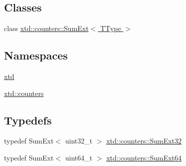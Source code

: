 \subsection*{Classes}
\begin{DoxyCompactItemize}
\item 
class \hyperlink{classxtd_1_1counters_1_1SumExt}{xtd\-::counters\-::\-Sum\-Ext$<$ T\-Type $>$}
\end{DoxyCompactItemize}
\subsection*{Namespaces}
\begin{DoxyCompactItemize}
\item 
\hyperlink{namespacextd}{xtd}
\item 
\hyperlink{namespacextd_1_1counters}{xtd\-::counters}
\end{DoxyCompactItemize}
\subsection*{Typedefs}
\begin{DoxyCompactItemize}
\item 
typedef Sum\-Ext$<$ uint32\-\_\-t $>$ \hyperlink{namespacextd_1_1counters_a7e0abdd1fae0f70421c2e0ea3924db6f}{xtd\-::counters\-::\-Sum\-Ext32}
\item 
typedef Sum\-Ext$<$ uint64\-\_\-t $>$ \hyperlink{namespacextd_1_1counters_a268d063d4f32d16f65c388b8791602e3}{xtd\-::counters\-::\-Sum\-Ext64}
\end{DoxyCompactItemize}
